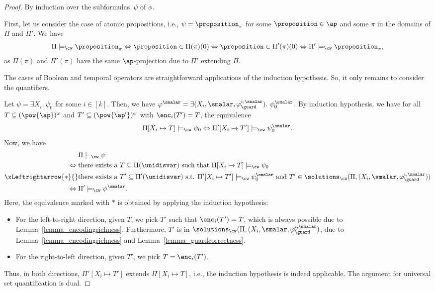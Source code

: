\begin{proof}
By induction over the subformulas~$\psi$ of $\phi$.

First, let us consider the case of atomic propositions, i.e., $\psi = \proposition_\pi$ for some $\proposition \in \ap$ and some $\pi$ in the domains of $\Pi$ and $\Pi'$. We have 
\[
\Pi\models_\cw\proposition_\pi \Leftrightarrow 
\proposition \in \Pi(\pi)(0) \Leftrightarrow 
\proposition \in \Pi'(\pi)(0) \Leftrightarrow 
\Pi'\models_\cw\proposition_\pi,
\]
as $\Pi(\pi)$ and $\Pi'(\pi)$ have the same $\ap$-projection due to $\Pi'$ extending $\Pi$.

The cases of Boolean and temporal operators are straightforward applications of the induction hypothesis. So, it only remains to consider the quantifiers. 

Let $\psi = \exists X_i.\ \psi_0$ for some $i \in [k]$. Then, we have $\varphi^{\smalar} = \exists (X_i, \smalar, \varphi_\guard^{i,\smalar}).\ \psi_0^{\smalar}$.
By induction hypothesis, we have for all $T \subseteq (\pow{\ap})^\omega$ and $T' \subseteq (\pow{\ap'})^\omega$ with $\enc_i(T') = T$, the equivalence
\[\Pi[X_i \mapsto T] \models_\cw \psi_0 \Leftrightarrow \Pi'[X_i \mapsto T' ] \models_\cw \psi_0^{\smalar}.\]
Now, we have 
\begin{align*}
&{}\Pi\models_\cw \psi\\
 \Leftrightarrow{} &{}\text{there exists a $T \subseteq \Pi(\unidisvar)$ such that } \Pi[X_i \mapsto T] \models_\cw \psi_0 \\
\xLeftrightarrow{\ast}{}&{}\text{there exists a $T' \subseteq \Pi'(\unidisvar)$ s.t. } \Pi'[X_i \mapsto T'] \models_\cw \psi_0^{\smalar} \text{ and  } T' \in \solutions_\cw(\Pi,( X_i, \smalar, \varphi_\guard^{i,\smalar} ))
\\
\Leftrightarrow{}&{}\Pi'\models_\cw \psi^{\smalar}.
\end{align*}
Here, the equivalence marked with $\ast$ is obtained by applying the induction hypothesis:
\begin{itemize}
    \item For the left-to-right direction, given $T$, we pick $T'$ such that $\enc_i(T') = T$, which is always possible due to Lemma~\ref{lemma_encodingrichness}. Furthermore, $T'$ is in $\solutions_\cw(\Pi,( X_i, \smalar, \varphi_\guard^{i,\smalar} )$, due to Lemma~\ref{lemma_encodingrichness} and Lemma~\ref{lemma_guardcorrectness}.
    \item For the right-to-left direction, given $T'$, we pick $T = \enc_i(T')$.
\end{itemize}
Thus, in both directions, $\Pi'[X_i \mapsto T']$ extends $\Pi[X_i \mapsto T] $, i.e., the induction hypothesis is indeed applicable.
The argument for universal set quantification is dual.


\end{proof}
